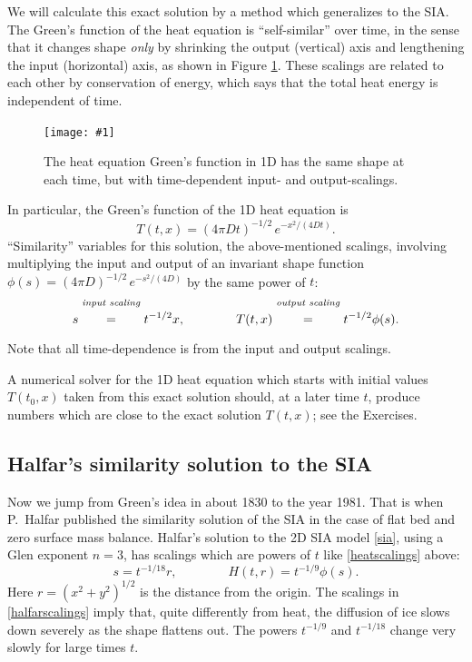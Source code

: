 \documentclass[letterpaper,final,12pt,reqno]{amsart}
\newcommand{\onefigsize}[3]{
\begin{figure}[ht]
\centering
\texttt{[image: \#1]}
\caption{#2}
\label{fig:#1}
\end{figure}}
\begin{document}
We will calculate this exact solution by a method which generalizes to the SIA.  The Green's function of the heat equation is ``self-similar'' over time, in the sense that it changes shape \emph{only} by shrinking the output (vertical) axis and lengthening the input (horizontal) axis, as shown in Figure \ref{fig:heatscaling}.  These scalings are related to each other by conservation of energy, which says that the total heat energy is independent of time.

\onefigsize{heatscaling}{The heat equation Green's function in 1D has the same shape at each time, but with time-dependent input- and output-scalings.}{2.4in}

In particular, the Green's function of the 1D heat equation is
  $$T(t,x) = (4 \pi D t)^{-1/2}\, e^{-x^2/(4Dt)}.$$
``Similarity'' variables for this solution, the above-mentioned scalings, involving multiplying the input and output of an invariant shape function $\phi(s) = (4 \pi D)^{-1/2}\, e^{-s^2/(4D)}$ by the same power of $t$:
\begin{equation}
s \stackrel{\text{\emph{input scaling}}}{\phantom{\Big|}=\phantom{\Big|}} t^{-1/2} x, \qquad\qquad T(t,x) \stackrel{\text{\emph{output scaling}}}{\phantom{\Big|}=\phantom{\Big|}} t^{-1/2} \phi(s).  \label{heatscalings}
\end{equation}
Note that all time-dependence is from the input and output scalings.

A numerical solver for the 1D heat equation which starts with initial values $T(t_0,x)$ taken from this exact solution should, at a later time $t$, produce numbers which are close to the exact solution $T(t,x)$; see the Exercises.

\subsection*{Halfar's similarity solution to the SIA}  Now we jump from Green's idea in about 1830 to the year 1981.  That is when P.~Halfar published the similarity solution of the SIA in the case of flat bed and zero surface mass balance.  Halfar's solution to the 2D SIA model \eqref{sia}, using a Glen exponent $n=3$, has scalings which are powers of $t$ like \eqref{heatscalings} above:
\begin{equation}
s = t^{-1/18} r, \qquad \qquad H(t,r)=t^{-1/9} \phi(s). \label{halfarscalings}
\end{equation}
Here $r=(x^2+y^2)^{1/2}$ is the distance from the origin.  The scalings in \eqref{halfarscalings} imply that, quite differently from heat, the diffusion of ice slows down severely as the shape flattens out.  The powers $t^{-1/9}$ and $t^{-1/18}$ change very slowly for large times $t$.
\end{document}
